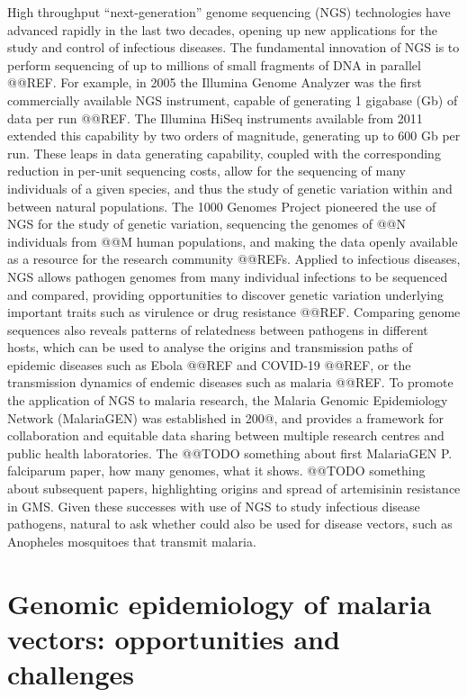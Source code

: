 \documentclass[a4paper,11pt,abstracton,hidelinks]{scrartcl}
\begin{document}
High throughput ``next-generation'' genome sequencing (NGS) technologies have advanced rapidly in the last two decades, opening up new applications for the study and control of infectious diseases.
%
The fundamental innovation of NGS is to perform sequencing of up to millions of small fragments of DNA in parallel @@REF.
%
For example, in 2005 the Illumina Genome Analyzer was the first commercially available NGS instrument, capable of generating 1 gigabase (Gb) of data per run @@REF.
%
The Illumina HiSeq instruments available from 2011 extended this capability by two orders of magnitude, generating up to 600 Gb per run.
%
These leaps in data generating capability, coupled with the corresponding reduction in per-unit sequencing costs, allow for the sequencing of many individuals of a given species, and thus the study of genetic variation within and between natural populations.
%
The 1000 Genomes Project pioneered the use of NGS for the study of genetic variation, sequencing the genomes of @@N individuals from @@M human populations, and making the data openly available as a resource for the research community @@REFs.
%
Applied to infectious diseases, NGS allows pathogen genomes from many individual infections to be sequenced and compared, providing opportunities to discover genetic variation underlying important traits such as virulence or drug resistance @@REF.
%
Comparing genome sequences also reveals patterns of relatedness between pathogens in different hosts, which can be used to analyse the origins and transmission paths of epidemic diseases such as Ebola @@REF and COVID-19 @@REF, or the transmission dynamics of endemic diseases such as malaria @@REF.
%
To promote the application of NGS to malaria research, the Malaria Genomic Epidemiology Network (MalariaGEN) was established in 200@, and provides a framework for collaboration and equitable data sharing between multiple research centres and public health laboratories. 
%
The @@TODO something about first MalariaGEN P. falciparum paper, how many genomes, what it shows.
%
@@TODO something about subsequent papers, highlighting origins and spread of artemisinin resistance in GMS.
%
Given these successes with use of NGS to study infectious disease pathogens, natural to ask whether could also be used for disease vectors, such as Anopheles mosquitoes that transmit malaria.
%


\section{Genomic epidemiology of malaria vectors: opportunities and challenges}
\end{document}
